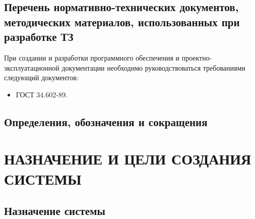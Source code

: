 \documentclass[14pt,russian]{extarticle}
\begin{document}
\subsection{Перечень нормативно-технических документов,\\методических материалов,
использованных при\\разработке ТЗ}

При создании и разработки программного обеспечения и проектно-\\эксплуатационной
документации необходимо руководствоваться требованиями следующий документов:

\begin{itemize}
	\item ГОСТ 34.602-89.
\end{itemize}

\subsection{Определения, обозначения и сокращения}

\begin{table}[H]
\end{table}

\clearpage
\section{НАЗНАЧЕНИЕ И ЦЕЛИ СОЗДАНИЯ СИСТЕМЫ}

\subsection{Назначение системы}
\end{document}
